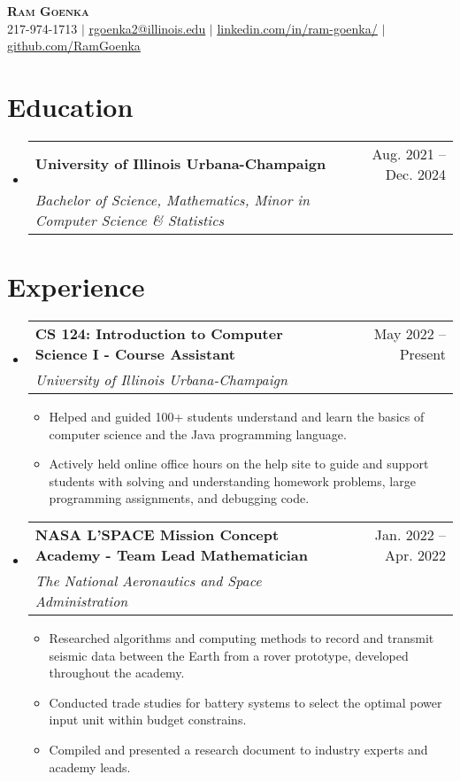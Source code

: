 \documentclass[letterpaper,11pt]{article}
\makeatletter
\newcommand{\resumeItem}[1]{
  \item\small{
    {#1 \vspace{-3pt}}
  }
}
\newcommand{\resumeSubheading}[4]{
  \vspace{-2pt}\item
    \begin{tabular*}{0.97\textwidth}[t]{l@{\extracolsep{\fill}}r}
      \textbf{#1} & #2 \\
      \textit{\small#3} & \textit{\small #4} \\
    \end{tabular*}\vspace{-7pt}
}
\newcommand{\resumeSubHeadingListStart}{\begin{itemize}[leftmargin=0.15in, label={}]}
\newcommand{\resumeSubHeadingListEnd}{\end{itemize}}
\newcommand{\resumeItemListStart}{\begin{itemize}}
\newcommand{\resumeItemListEnd}{\end{itemize}\vspace{-5pt}}
\makeatother
\begin{document}
\begin{center}
    \textbf{\Huge \scshape Ram Goenka} \\ \vspace{1pt}
    \small 217-974-1713 $|$ \href{mailto:rgoenka2@illinois.edu}{\underline{rgoenka2@illinois.edu}} $|$ 
    \href{https://www.linkedin.com/in/ram-goenka/}{\underline{linkedin.com/in/ram-goenka/}} $|$
    \href{https://github.com/RamGoenka}{\underline{github.com/RamGoenka}}
\end{center}
\section{Education}
  \resumeSubHeadingListStart
    \resumeSubheading
      {University of Illinois Urbana-Champaign}{Aug. 2021 -- Dec. 2024}
      {Bachelor of Science, Mathematics, Minor in Computer Science \& Statistics}{~}
  \resumeSubHeadingListEnd
\section{Experience}
  \resumeSubHeadingListStart

    \resumeSubheading
      {CS 124: Introduction to Computer Science I - Course Assistant}{May 2022 -- Present}
      {University of Illinois Urbana-Champaign}{~~}
      \resumeItemListStart
        \resumeItem{Helped and guided 100+ students understand and learn the basics of computer science and the Java programming language.}
        \resumeItem{Actively held online office hours on the help site to guide and support students with solving and understanding homework problems, large programming assignments, and debugging code.}
      \resumeItemListEnd
      
    \resumeSubheading
      {NASA L'SPACE Mission Concept Academy - Team Lead Mathematician}{Jan. 2022 -- Apr. 2022}
      {The National Aeronautics and Space Administration}{~~~~~~}
      \resumeItemListStart
        \resumeItem{Researched algorithms and computing methods to record and transmit seismic data between the Earth from a rover prototype, developed throughout the academy.}
        \resumeItem{Conducted trade studies for battery systems to select the optimal power input unit within budget constrains.}
        \resumeItem{Compiled and presented a research document to industry experts and academy leads.}
    \resumeItemListEnd
  \resumeSubHeadingListEnd
\end{document}
